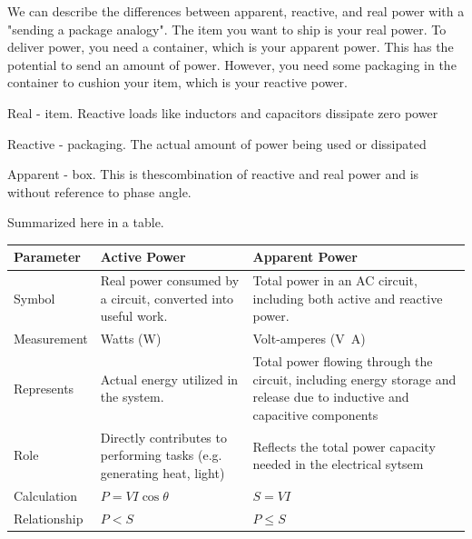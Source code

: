 We can describe the differences between apparent, reactive, and real power with a "sending a package analogy". The item you want to ship is your real power. To deliver power, you need a container, which is your apparent power. This has the potential to send an amount of power. However, you need some packaging in the container to cushion your item, which is your reactive power.
\begin{pline}
    \item Real - item. Reactive loads like inductors and capacitors dissipate zero power
    \item Reactive - packaging. The actual amount of power being used or dissipated
    \item Apparent - box. This is thescombination of reactive and real power and is without reference to phase angle.
\end{pline}
Summarized here in a table.
\begin{table}[H]
    \centering
    \begin{tabular}{ |p{4cm}|p{5.5cm}|p{5.5cm}|}
        \hline
        Parameter 
            & Active Power 
            & Apparent Power \\ \hline
        Symbol 
            & Real power consumed by a circuit, converted into useful work. 
            & Total power in an AC circuit, including both active and reactive power. \\ \hline
        Measurement
            & Watts (\unit{\watt}) 
            & Volt-amperes (\unit{\volt\ampere}) \\ \hline
        Represents 
            & Actual energy utilized in the system. 
            & Total power flowing through the circuit, including energy storage and release due to inductive and capacitive components \\ \hline
        Role 
            & Directly contributes to performing tasks (e.g. generating heat, light)
            & Reflects the total power capacity needed in the electrical sytsem \\ \hline
        Calculation 
            & $P = VI \cos{\theta}$
            & $S = VI$ \\ \hline
        Relationship
            & $P < S$
            & $P \leq S$ \\ \hline
    \end{tabular}
\end{table}

